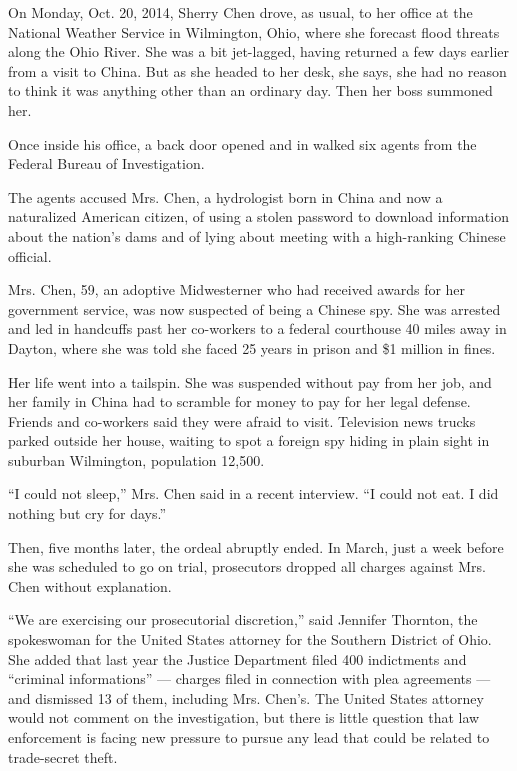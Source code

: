 On Monday, Oct. 20, 2014, Sherry Chen drove, as usual, to her office at
the National Weather Service in Wilmington, Ohio, where she forecast
flood threats along the Ohio River. She was a bit jet-lagged, having
returned a few days earlier from a visit to China. But as she headed to
her desk, she says, she had no reason to think it was anything other
than an ordinary day. Then her boss summoned her.

Once inside his office, a back door opened and in walked six agents from
the Federal Bureau of Investigation.

The agents accused Mrs. Chen, a hydrologist born in China and now a
naturalized American citizen, of using a stolen password to download
information about the nation's dams and of lying about meeting with a
high-ranking Chinese official.

Mrs. Chen, 59, an adoptive Midwesterner who had received awards for her
government service, was now suspected of being a Chinese spy. She was
arrested and led in handcuffs past her co-workers to a federal
courthouse 40 miles away in Dayton, where she was told she faced 25
years in prison and \$1 million in fines.

Her life went into a tailspin. She was suspended without pay from her
job, and her family in China had to scramble for money to pay for her
legal defense. Friends and co-workers said they were afraid to visit.
Television news trucks parked outside her house, waiting to spot a
foreign spy hiding in plain sight in suburban Wilmington, population
12,500.

``I could not sleep,'' Mrs. Chen said in a recent interview. ``I could
not eat. I did nothing but cry for days.''

Then, five months later, the ordeal abruptly ended. In March, just a
week before she was scheduled to go on trial, prosecutors dropped all
charges against Mrs. Chen without explanation.

``We are exercising our prosecutorial discretion,'' said Jennifer
Thornton, the spokeswoman for the United States attorney for the
Southern District of Ohio. She added that last year the Justice
Department filed 400 indictments and ``criminal informations'' ---
charges filed in connection with plea agreements --- and dismissed 13 of
them, including Mrs. Chen's. The United States attorney would not
comment on the investigation, but there is little question that law
enforcement is facing new pressure to pursue any lead that could be
related to trade-secret theft.

